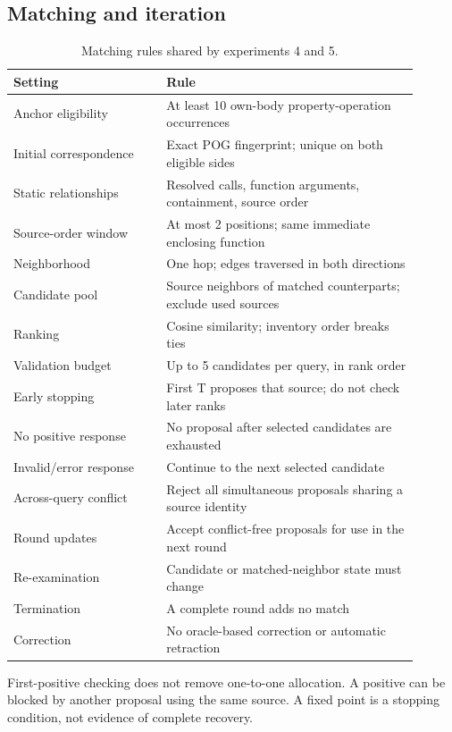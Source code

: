 \subsection{Matching and iteration}
\begin{table}[htbp]
\caption{Matching rules shared by experiments 4 and 5.}
\label{tab:matching-settings}
\centering\small
\begin{tabular}{p{0.34\linewidth}p{0.56\linewidth}}
\toprule
Setting & Rule\\
\midrule
Anchor eligibility & At least 10 own-body property-operation occurrences\\
Initial correspondence & Exact POG fingerprint; unique on both eligible sides\\
Static relationships & Resolved calls, function arguments, containment, source order\\
Source-order window & At most 2 positions; same immediate enclosing function\\
Neighborhood & One hop; edges traversed in both directions\\
Candidate pool & Source neighbors of matched counterparts; exclude used sources\\
Ranking & Cosine similarity; inventory order breaks ties\\
Validation budget & Up to 5 candidates per query, in rank order\\
Early stopping & First T proposes that source; do not check later ranks\\
No positive response & No proposal after selected candidates are exhausted\\
Invalid/error response & Continue to the next selected candidate\\
Across-query conflict & Reject all simultaneous proposals sharing a source identity\\
Round updates & Accept conflict-free proposals for use in the next round\\
Re-examination & Candidate or matched-neighbor state must change\\
Termination & A complete round adds no match\\
Correction & No oracle-based correction or automatic retraction\\
\bottomrule
\end{tabular}
\end{table}
First-positive checking does not remove one-to-one allocation. A positive can be blocked by another proposal using the same source. A fixed point is a stopping condition, not evidence of complete recovery.


